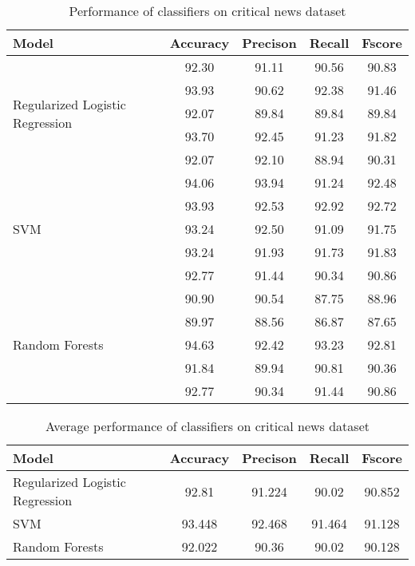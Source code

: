 \begin{table}[h]
\begin{center}
\caption{Performance of classifiers on critical news dataset}
\label{tbl:critical_news_performance}
\begin{tabular}{@{}lcccc@{}}
\toprule 
Model&Accuracy&Precison&Recall&Fscore\\
\midrule 
\multirow{5}{*}{Regularized Logistic Regression}&92.30&91.11&90.56&90.83\\&93.93&90.62&92.38&91.46\\&92.07&89.84&89.84&89.84\\&93.70&92.45&91.23&91.82\\&92.07&92.10&88.94&90.31\\
\hline
\multirow{5}{*}{SVM}&94.06&93.94&91.24&92.48\\&93.93&92.53&92.92&92.72\\&93.24&92.50&91.09&91.75\\&93.24&91.93&91.73&91.83\\&92.77&91.44&90.34&90.86\\
\hline
\multirow{5}{*}{Random Forests}&90.90&90.54&87.75&88.96\\&89.97&88.56&86.87&87.65\\&94.63&92.42&93.23&92.81\\&91.84&89.94&90.81&90.36\\&92.77&90.34&91.44&90.86\\
\bottomrule
\end{tabular}
\end{center}
\end{table}

\begin{table}[h]
\begin{center}
\caption{Average performance of classifiers on critical news dataset}
\label{tbl:average_performance}
\begin{tabular}{@{}lcccc@{}}
\toprule 
Model&Accuracy&Precison&Recall&Fscore\\
\midrule 
Regularized Logistic Regression&92.81&91.224&90.02&90.852\\
SVM&93.448&92.468&91.464&91.128\\
Random Forests&92.022&90.36&90.02&90.128\\
\bottomrule
\end{tabular}
\end{center}
\end{table}

